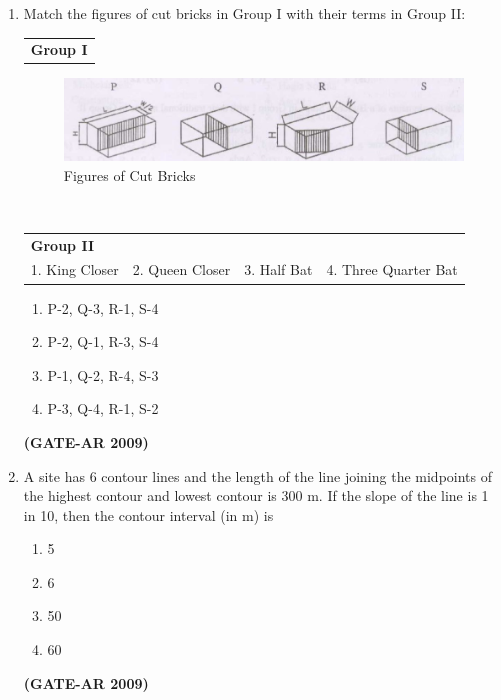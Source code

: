 \documentclass[a4paper,10pt]{article}
\begin{document}
\begin{enumerate}
    \item Match the figures of cut bricks in Group I with their terms in Group II:  \\
    \begin{tabular}{ l }
	\textbf{Group I} \\
	\end{tabular}
	\begin{figure}[h!]
        \centering
        \includegraphics[width=0.5\linewidth]{figs/img_01.jpg}
	\caption{Figures of Cut Bricks}
	\end{figure} \\
    \begin{tabular}{ l l l l }
	\textbf{Group II} & & & \\
	1. King Closer & 2. Queen Closer & 3. Half Bat & 4. Three Quarter Bat \\
	\end{tabular}
	\begin{multicols}{2}
	\begin{enumerate}
        \item P-2, Q-3, R-1, S-4
        \item P-2, Q-1, R-3, S-4
        \item P-1, Q-2, R-4, S-3
        \item P-3, Q-4, R-1, S-2
    \end{enumerate}
	\end{multicols}
    \hfill \textbf{(GATE-AR 2009)}

    \item A site has 6 contour lines and the length of the line joining the midpoints of the highest contour and lowest contour is 300 m. If the slope of the line is 1 in 10, then the contour interval (in m) is 
    \begin{multicols}{4}
	\begin{enumerate}
        \item 5
        \item 6
        \item 50
        \item 60
    \end{enumerate}
	\end{multicols}
    \hfill \textbf{(GATE-AR 2009)}
	

\end{enumerate}
\end{document}
